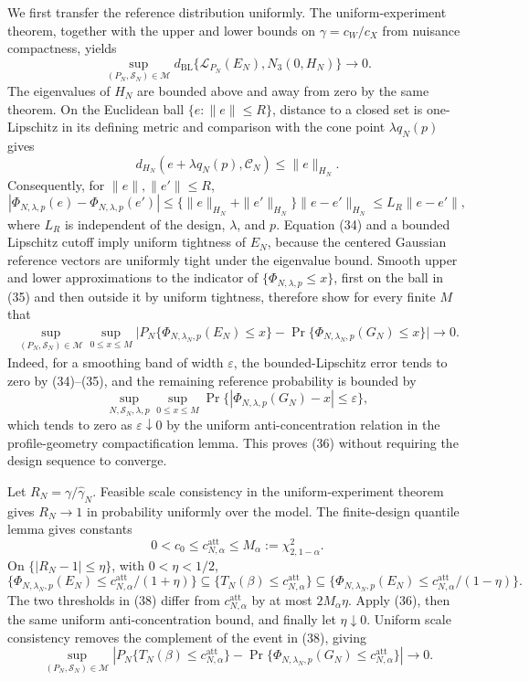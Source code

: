 We first transfer the reference distribution uniformly.  The uniform-experiment theorem, together with the upper and lower bounds on \(\gamma=c_W/c_X\) from nuisance compactness, yields
\[
\sup_{(P_N,\mathcal S_N)\in\mathcal M}
d_{\mathrm{BL}}\{\mathcal L_{P_N}(E_N),N_3(0,H_N)\}\longrightarrow0.        \tag{34}
\]
The eigenvalues of \(H_N\) are bounded above and away from zero by the same theorem.  On the Euclidean ball \(\{e:\|e\|\le R\}\), distance to a closed set is one-Lipschitz in its defining metric and comparison with the cone point \(\lambda q_N(p)\) gives
\[
d_{H_N}(e+\lambda q_N(p),\mathcal C_N)\le\|e\|_{H_N}.
\]
Consequently, for \(\|e\|,\|e'\|\le R\),
\[
|\Phi_{N,\lambda,p}(e)-\Phi_{N,\lambda,p}(e')|
\le \{\|e\|_{H_N}+\|e'\|_{H_N}\}\|e-e'\|_{H_N}
\le L_R\|e-e'\|,                                                            \tag{35}
\]
where \(L_R\) is independent of the design, \(\lambda\), and \(p\).  Equation (34) and a bounded Lipschitz cutoff imply uniform tightness of \(E_N\), because the centered Gaussian reference vectors are uniformly tight under the eigenvalue bound.  Smooth upper and lower approximations to the indicator of \(\{\Phi_{N,\lambda,p}\le x\}\), first on the ball in (35) and then outside it by uniform tightness, therefore show for every finite \(M\) that
\[
\begin{split}
\sup_{(P_N,\mathcal S_N)\in\mathcal M}\sup_{0\le x\le M}
\big|P_N\{\Phi_{N,\lambda_N,p}(E_N)\le x\}
{}-{}\Pr\{\Phi_{N,\lambda_N,p}(G_N)\le x\}\big|\longrightarrow0.          \tag{36}
\end{split}
\]
Indeed, for a smoothing band of width \(\varepsilon\), the bounded-Lipschitz error tends to zero by (34)--(35), and the remaining reference probability is bounded by
\[
\sup_{N,\mathcal S_N,\lambda,p}\sup_{0\le x\le M}
\Pr\{|\Phi_{N,\lambda,p}(G_N)-x|\le\varepsilon\},
\]
which tends to zero as \(\varepsilon\downarrow0\) by the uniform anti-concentration relation in the profile-geometry compactification lemma.  This proves (36) without requiring the design sequence to converge.

Let \(R_N=\gamma/\widehat\gamma_N\).  Feasible scale consistency in the uniform-experiment theorem gives \(R_N\to1\) in probability uniformly over the model.  The finite-design quantile lemma gives constants
\[
0<c_0\le c_{N,\alpha}^{\mathrm{att}}\le M_\alpha:=\chi^2_{2,1-\alpha}.        \tag{37}
\]
On \(\{|R_N-1|\le\eta\}\), with \(0<\eta<1/2\),
\[
\{\Phi_{N,\lambda_N,p}(E_N)\le c_{N,\alpha}^{\mathrm{att}}/(1+\eta)\}
\subseteq\{T_N(\beta)\le c_{N,\alpha}^{\mathrm{att}}\}
\subseteq
\{\Phi_{N,\lambda_N,p}(E_N)\le c_{N,\alpha}^{\mathrm{att}}/(1-\eta)\}.     \tag{38}
\]
The two thresholds in (38) differ from \(c_{N,\alpha}^{\mathrm{att}}\) by at most \(2M_\alpha\eta\).  Apply (36), then the same uniform anti-concentration bound, and finally let \(\eta\downarrow0\).  Uniform scale consistency removes the complement of the event in (38), giving
\[
\sup_{(P_N,\mathcal S_N)\in\mathcal M}
\left|P_N\{T_N(\beta)\le c_{N,\alpha}^{\mathrm{att}}\}
-\Pr\{\Phi_{N,\lambda_N,p}(G_N)\le c_{N,\alpha}^{\mathrm{att}}\}\right|
\longrightarrow0.                                                            \tag{39}
\]

